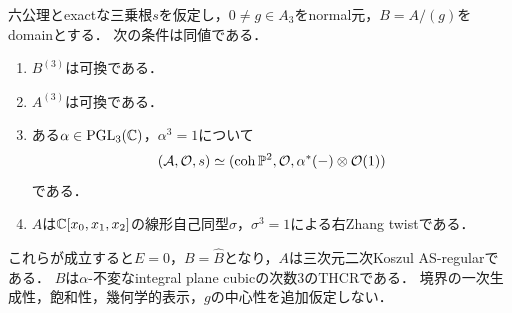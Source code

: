 \documentclass[11pt,a4paper]{ltjsarticle}
\begin{document}
\begin{theorem}[可換な第三Veronese境界からの認識]
\label{thm:v8-commutative-veronese-boundary}
六公理とexactな三乗根$s$を仮定し，$0\ne g\in A_3$をnormal元，$B=A/(g)$をdomainとする．
次の条件は同値である．
\begin{enumerate}[label=(\roman*)]
\item $B^{(3)}$は可換である．
\item $A^{(3)}$は可換である．
\item ある$\alpha\in\operatorname{PGL}_3(\mathbb C)$，$\alpha^3=1$について
\[
 (\mathcal A,\mathcal O,s)\simeq
 (\operatorname{coh}\mathbb P^2,\mathcal O,\alpha^*(-)\otimes\mathcal O(1))
\]
である．
\item $A$は$\mathbb C[x_0,x_1,x_2]$の線形自己同型$\sigma$，$\sigma^3=1$による右Zhang twistである．
\end{enumerate}
これらが成立すると$E=0$，$B=\widehat B$となり，$A$は三次元二次Koszul AS-regularである．
$B$は$\alpha$-不変なintegral plane cubicの次数3のTHCRである．
境界の一次生成性，飽和性，幾何学的表示，$g$の中心性を追加仮定しない．
\end{theorem}
\end{document}
